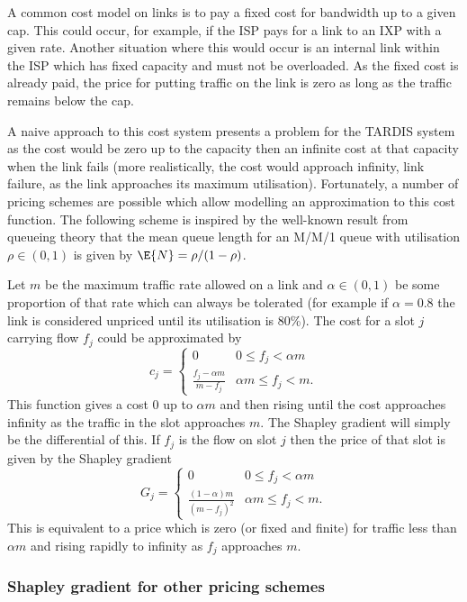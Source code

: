 A common cost model on links is to pay a fixed cost for bandwidth
up to a given cap.  This could occur, for example, if the ISP pays
for a link to an IXP with a given rate.  Another situation where this
would occur is an internal link within the ISP which has fixed capacity
and must not be overloaded.  As the fixed cost is already paid, the
price for putting traffic on the link is zero as long as the traffic
remains below the cap.

A naive approach to this cost system presents a problem for the
TARDIS system as the cost would be zero up to the capacity
then an infinite cost at that capacity when
the link fails (more realistically, the cost would approach
infinity, link failure, as the link approaches its maximum utilisation). 
Fortunately, a number of 
pricing schemes are possible which allow modelling an approximation
to this cost function.  The following scheme is inspired by the
well-known result from queueing theory that the mean queue length
for an M/M/1 queue with utilisation $\rho \in (0,1)$ is given by
$\E{N} = \rho/(1-\rho)$.

Let $m$ be the maximum traffic rate allowed on a link and 
$\alpha \in (0,1)$ be some
proportion of that rate which can always be tolerated (for example
if $\alpha = 0.8$ the link is considered unpriced until
its utilisation is 80\%).  The cost for
a slot $j$ carrying flow $f_j$ could be approximated by
$$
c_j = 
\begin{cases}
0 & 0 \leq f_j < \alpha m \\
\frac{f_j-\alpha m}{m-f_j} &  \alpha m \leq f_j < m.
\end{cases}
$$
This function gives a cost 0 up to $\alpha m$ and then rising
until the cost approaches infinity as the traffic in the
slot approaches $m$.
The Shapley gradient will simply be the differential of this.
If $f_j$ is the flow on slot $j$ then the price of that slot
is given by the Shapley gradient
$$
G_j =
\begin{cases}
0 & 0 \leq f_j < \alpha m \\
\frac{(1-\alpha)m}{(m-f_j)^2} &  \alpha m \leq f_j < m.
\end{cases}
$$
This is equivalent to a price which is zero (or fixed and finite)
for traffic less than $\alpha m$ and rising rapidly to infinity as
$f_j$ approaches $m$.

\subsubsection{Shapley gradient for other pricing schemes}
\label{sec:other_price}


